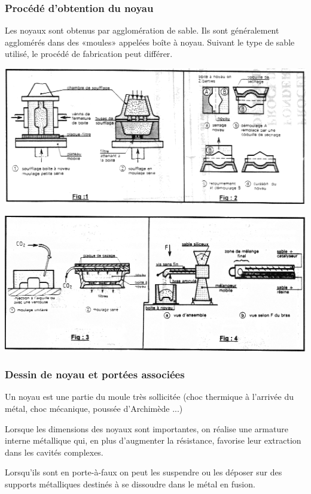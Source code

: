 \documentclass[11pt,oneside]{article}
\begin{document}
\subsubsection{Procédé d'obtention du noyau}
Les noyaux sont obtenus par agglomération de sable. Ils sont généralement
agglomérés dans des «moules» appelées boîte à noyau. Suivant le type de sable
utilisé, le procédé de fabrication peut différer. 

\begin{center}
 \includegraphics[width=.8\textwidth]{png/boite1}
\end{center}

\begin{center}
 \includegraphics[width=.8\textwidth]{png/boite2}
\end{center}

\subsubsection{Dessin de noyau et portées associées}
Un noyau est une partie du moule très sollicitée (choc thermique à l'arrivée du
métal, choc mécanique, poussée d'Archimède ...)

Lorsque les dimensions des noyaux sont importantes, on réalise une armature
interne métallique qui, en plus d'augmenter la résistance, favorise leur
extraction dans les cavités complexes. 

Lorsqu'ils sont en porte-à-faux on peut les suspendre ou les déposer sur des
supports métalliques destinés à se dissoudre dans le métal en fusion. 
\end{document}
